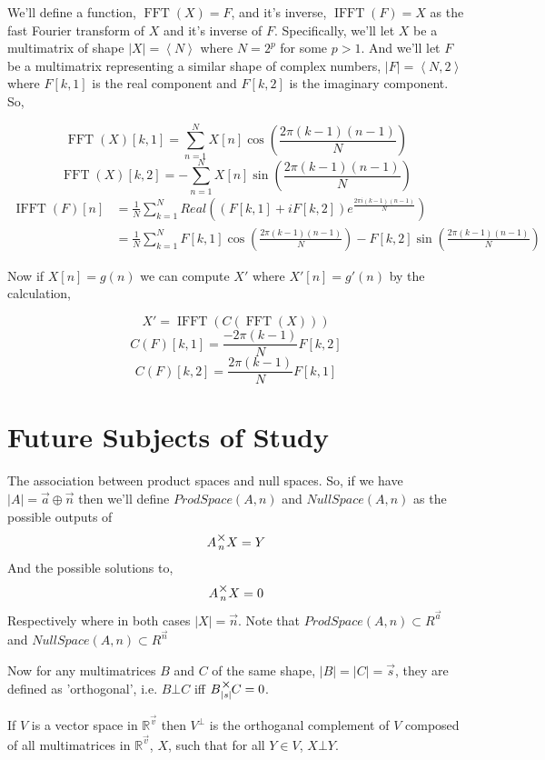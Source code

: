 \documentclass[12pt]{book}
\theoremstyle{plain}
\theoremstyle{definition}
\theoremstyle{ppart}
\theoremstyle{case}
\theoremstyle{solution}
\DeclareMathOperator{\FFT}{FFT}
\DeclareMathOperator{\IFFT}{IFFT}
\newcommand{\mmult}[1]{\text{\raisebox{1ex}{$\underset{#1}{\times}$}}}
\newcommand{\shape}[1]{\left|#1\right|}
\begin{document}
\begin{appendices}
\begin{landscape}
We'll define a function, $\FFT(X) = F$, and it's inverse, $\IFFT(F) = X$ as the fast Fourier transform of $X$ and it's inverse of $F$.
Specifically, we'll let $X$ be a multimatrix of shape $\shape{X} = \left<N\right>$ where $N = 2^p$ for some $p>1$.
And we'll let $F$ be a multimatrix representing a similar shape of complex numbers, $\shape{F} = \left<N, 2\right>$ where $F[k,1]$ is
the real component and $F[k,2]$ is the imaginary component. So,

\[ \FFT(X)[k,1] = \sum_{n=1}^{N} X[n] \cos\left(\frac{2 \pi (k-1)(n-1)}{N}\right) \]
\[ \FFT(X)[k,2] = -\sum_{n=1}^{N} X[n] \sin\left(\frac{2 \pi (k-1)(n-1)}{N}\right) \]
\begin{align*}
  \IFFT(F)[n]
  &= \frac{1}{N} \sum_{k=1}^{N} Real\left( (F[k,1]+i F[k,2]) e^{\frac{2 \pi i (k-1)(n-1)}{N} } \right) \\
  &= \frac{1}{N} \sum_{k=1}^{N} F[k,1] \cos\left(\frac{2 \pi (k-1)(n-1)}{N}\right) - F[k,2] \sin\left(\frac{2 \pi (k-1)(n-1)}{N}\right)
\end{align*}

Now if $X[n] = g(n)$ we can compute $X'$ where $X'[n] = g'(n)$ by the calculation,

\[ X' = \IFFT(C(\FFT(X))) \]
\[ C(F)[k,1] = \frac{-2 \pi (k-1)}{N} F[k,2] \]
\[ C(F)[k,2] = \frac{2 \pi (k-1)}{N} F[k,1] \]

\end{landscape}

\chapter{Future Subjects of Study}

The association between product spaces and null spaces. So, if we have $\shape{A} = \vec{a} \oplus \vec{n}$
then we'll define $ProdSpace(A, n)$ and $NullSpace(A, n)$ as the possible outputs of
\[ A \mmult{n} X = Y \]
And the possible solutions to,
\[ A \mmult{n} X = 0 \]
Respectively where in both cases $\shape{X} = \vec{n}$. 
Note that $ProdSpace(A, n) \subset R^{\vec{a}}$ and $NullSpace(A, n) \subset R^{\vec{n}}$

Now for any multimatrices $B$ and $C$ of the same shape, $\shape{B} = \shape{C} = \vec{s}$,
they are defined as 'orthogonal', i.e. $B \bot C$ iff $B \mmult{\shape{s}} C = 0$.

If $V$ is a vector space in $\mathbb{R}^{\vec{v}}$ then $V^{\bot}$ is the
orthoganal complement of $V$ composed of all multimatrices in $\mathbb{R}^{\vec{v}}$, $X$, 
such that for all $Y \in V$, $X \bot Y$. 


\end{appendices}
\end{document}
